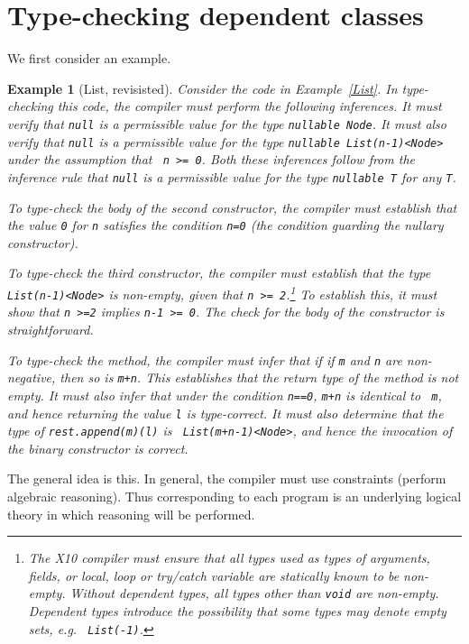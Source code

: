 \documentclass[fullpage]{article}
\def\Xten{{\sf X10}}
\newtheorem{example}{Example}[section]
\begin{document}
\section{Type-checking dependent classes}

We first consider an example.
\begin{example}[List, revisisted]
Consider the code in Example~\ref{List}.  In type-checking this code,
the compiler must perform the following inferences. It must verify
that {\tt null} is a permissible value for the type {\tt nullable
Node}. It must also verify that {\tt null} is a permissible value for
the type {\tt nullable List(n-1)<Node>} under the assumption that {\tt
n >= 0}. Both these inferences follow from the inference rule that
{\tt null} is a permissible value for the type {\tt nullable T} for
any {\tt T}.

To type-check the body of the second constructor, the compiler must
establish that the value {\tt 0} for {\tt n} satisfies the condition
{\tt n=0} (the condition guarding the nullary constructor).

To type-check the third constructor, the compiler must establish that
the type {\tt List(n-1)<Node>} is non-empty, given that {\tt n >=
2}.\footnote{The \Xten{} compiler must ensure that all types used as
types of arguments, fields, or local, loop or try/catch variable are
statically known to be non-empty. Without dependent types, all types
other than {\tt void} are non-empty. Dependent types introduce the
possibility that some types may denote empty sets, e.g. {\tt
List(-1)}.}  To establish this, it must show that {\tt n >=2} implies
{\tt n-1 >= 0}. The check for the body of the constructor is
straightforward.

To type-check the method, the compiler must infer that if if {\tt m}
and {\tt n} are non-negative, then so is {\tt m+n}. This establishes
that the return type of the method is not empty. It must also infer
that under the condition {\tt n==0}, {\tt m+n} is identical to {\tt
m}, and hence returning the value {\tt l} is type-correct. It must
also determine that the type of {\tt rest.append(m)(l)} is {\tt
List(m+n-1)<Node>}, and hence the invocation of the binary constructor
is correct.
\end{example}

The general idea is this. In general, the compiler must use
constraints (perform algebraic reasoning). Thus corresponding to each
program is an underlying logical theory in which reasoning will be
performed. 
\end{document}
